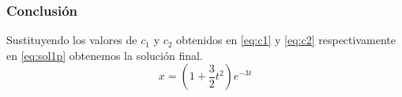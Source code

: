     \subsubsection*{Conclusión}
        Sustituyendo los valores de $c_1$ y $c_2$ obtenidos en \eqref{eq:c1} y \eqref{eq:c2} respectivamente en \eqref{eq:sol1p}
        obtenemos la solución final.
        \begin{equation*}
            \boxed{x =  \left(1 + \frac{3}{2} t^2\right)e^{-3t}}
        \end{equation*}